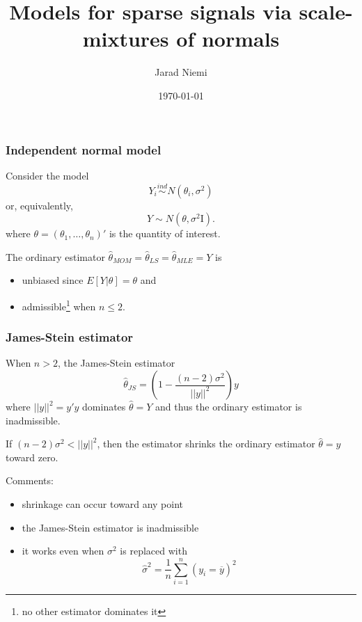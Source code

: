 \documentclass[handout]{beamer}
\title[Sparse signals]{Models for sparse signals via scale-mixtures of normals}
\author{Jarad Niemi}
\institute[Iowa State]{Iowa State University}
\date{\today}
\begin{document}
\begin{frame}
\maketitle
\end{frame}

\newcommand{\I}{\mathrm{I}}

\begin{frame}
\frametitle{Independent normal model}
Consider the model 
\[ Y_i \stackrel{ind}{\sim} N(\theta_i,\sigma^2) \]
\pause or, equivalently,
\[ Y \sim N(\theta, \sigma^2\I). \]
where $\theta = (\theta_1,\ldots,\theta_n)'$ is the quantity of interest.

\vspace{0.2in} \pause

The ordinary estimator $\hat{\theta}_{MOM} = \hat{\theta}_{LS} = \hat{\theta}_{MLE} = Y$ \pause is

\begin{itemize}
\item \alert{unbiased} since $E[Y|\theta]=\theta$ \pause and 
\item \alert{admissible}\footnote{no other estimator \alert{dominates} it} when $n\le 2$.
\end{itemize}
\end{frame}


\begin{frame}
\frametitle{James-Stein estimator}
\small
When $n>2$, the James-Stein estimator 
\[ \hat{\theta}_{JS} = \left( 1-\frac{(n-2)\sigma^2}{||y||^2}\right)y \]
where $||y||^2=y'y$ \pause \alert{dominates} $\hat{\theta}=Y$ and thus the ordinary estimator is inadmissible.

\vspace{0.2in} \pause

If $(n-2)\sigma^2 < ||y||^2$, then the estimator shrinks the ordinary estimator $\hat{\theta}=y$ toward zero.

\vspace{0.2in} \pause 

Comments:
\begin{itemize}[<+->]
\item shrinkage can occur toward any point
\item the James-Stein estimator is inadmissible
\item it works even when $\sigma^2$ is replaced with 
\[ \hat{\sigma}^2 = \frac{1}{n}\sum_{i=1}^n (y_i=\overline{y})^2 \]
\end{itemize}
\end{frame}
  
\end{document}

